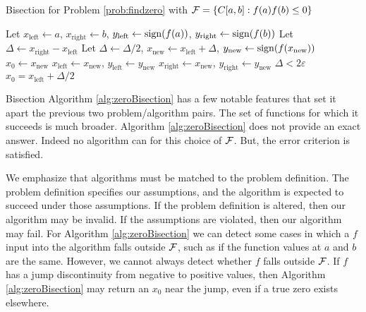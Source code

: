 \begin{algorithm}
\caption{Bisection for Problem \ref{prob:findzero} with $\mathcal{F} = \{C[a,b] : f(a)f(b) \le 0\}$  \label{alg:zeroBisection}}
	\begin{algorithmic}
    \State Let $x_{\text{left}} \leftarrow a$, $x_{\text{right}} \leftarrow b$, $y_{\text{left}} \leftarrow \operatorname{sign}(f(a))$, $y_{\text{right}} \leftarrow \operatorname{sign}(f(b))$
    \State Let $\Delta \leftarrow x_{\text{right}}- x_{\text{left}}$
    \Repeat
    \State Let $\Delta \leftarrow \Delta/2$, $x_{\text{new}} \leftarrow x_{\text{left}} + \Delta$, $y_{\text{new}} \leftarrow \operatorname{sign}(f(x_{\text{new}}))$
    \RETURN $x_0 \leftarrow x_\text{new}$
    \State $x_{\text{left}} \leftarrow x_{\text{new}}$, $y_{\text{left}} \leftarrow y_{\text{new}}$
    \Else
        \State $x_{\text{right}} \leftarrow x_{\text{new}}$, $y_{\text{right}} \leftarrow y_{\text{new}}$
    \EndIf
    \Until $\Delta < 2\varepsilon$
    \RETURN $x_0 = x_{\text{left}} + \Delta/2$

    \end{algorithmic}
\end{algorithm}

Bisection Algorithm \ref{alg:zeroBisection} has a few notable features that set it apart the previous two problem/algorithm pairs.  The set of functions for which it succeeds is much broader.  Algorithm \ref{alg:zeroBisection} does not provide an exact answer.  Indeed no algorithm can for this choice of $\mathcal{F}$. But, the error criterion is satisfied. 

We emphasize that algorithms must be matched to the problem definition.  The problem definition specifies our assumptions, and the algorithm is expected to succeed under those assumptions.  If the problem definition is altered, then our algorithm may be invalid.  If the assumptions are violated, then our algorithm may fail.  For Algorithm \ref{alg:zeroBisection} we can detect some cases in which a $f$ input into the algorithm falls outside $\mathcal{F}$, such as if the function values at $a$ and $b$ are the same.  However, we cannot always detect whether $f$ falls outside $\mathcal{F}$.  If $f$ has a jump discontinuity from negative to positive values, then Algorithm \ref{alg:zeroBisection} may return an $x_0$ near the jump, even if a true zero exists elsewhere.

